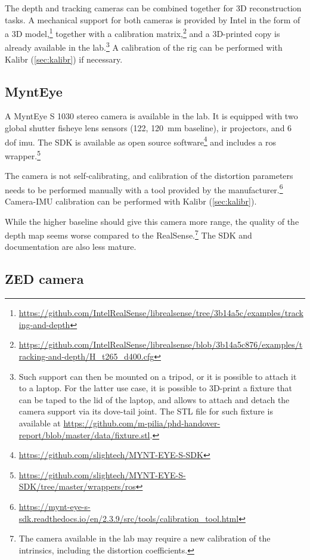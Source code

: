 \documentclass[11pt, letterpaper, twoside]{article}
\begin{document}
The depth and tracking cameras can be combined together for 3D reconstruction
tasks. A mechanical support for both cameras is provided by Intel in the form
of a 3D
model,\footnote{\url{https://github.com/IntelRealSense/librealsense/tree/3b14a5c/examples/tracking-and-depth}}
together with a calibration
matrix,\footnote{\url{https://github.com/IntelRealSense/librealsense/blob/3b14a5c876/examples/tracking-and-depth/H_t265_d400.cfg}}
and a 3D-printed copy is already available in the lab.\footnote{Such support
    can then be mounted on a tripod, or it is possible to attach it to a
    laptop. For the latter use case, it is possible to 3D-print a fixture that
    can be taped to the lid of the laptop, and allows to attach and detach the
    camera support via its dove-tail joint. The STL file for such fixture is
available at
\url{https://github.com/m-pilia/phd-handover-report/blob/master/data/fixture.stl}.}
A calibration of the rig can be performed with Kalibr (\cref{sec:kalibr}) if
necessary.

\subsection{MyntEye}

A MyntEye S 1030 stereo camera is available in the lab. It is equipped with two
global shutter fisheye lens sensors (122\textdegree{}\textdegree,
120~mm baseline), \gls{ir} projectors, and 6 \gls{dof} \gls{imu}. The SDK is
available as open source
software\footnote{\url{https://github.com/slightech/MYNT-EYE-S-SDK}} and
includes a \gls{ros}
wrapper.\footnote{\url{https://github.com/slightech/MYNT-EYE-S-SDK/tree/master/wrappers/ros}}

The camera is not self-calibrating, and calibration of the distortion
parameters needs to be performed manually with a tool provided by the
manufacturer.\footnote{\url{https://mynt-eye-s-sdk.readthedocs.io/en/2.3.9/src/tools/calibration_tool.html}}
Camera-IMU calibration can be performed with Kalibr (\cref{sec:kalibr}).

While the higher baseline should give this camera more range, the quality of
the depth map seems worse compared to the RealSense.\footnote{The camera
available in the lab may require a new calibration of the intrinsics, including
the distortion coefficients.} The SDK and documentation are also less mature.

\subsection{ZED camera}
\end{document}
